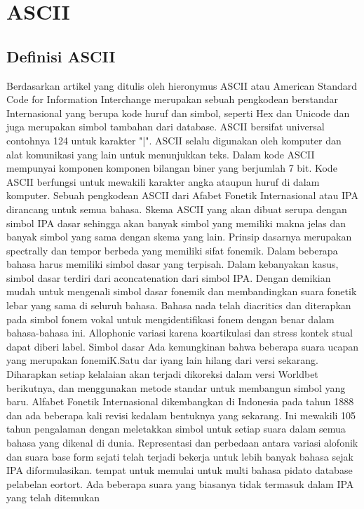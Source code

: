 \section{ASCII}
\subsection{Definisi ASCII}
		Berdasarkan artikel yang ditulis oleh hieronymus \cite{hieronymus1993ascii}
	ASCII atau American Standard Code for Information Interchange merupakan sebuah pengkodean berstandar Internasional yang berupa kode huruf dan simbol, seperti Hex dan Unicode dan juga merupakan simbol tambahan dari database. ASCII bersifat universal contohnya 124 untuk karakter "|". ASCII selalu digunakan oleh komputer dan alat komunikasi yang lain untuk menunjukkan teks.
    Dalam kode ASCII mempunyai komponen komponen bilangan biner yang berjumlah 7 bit. Kode ASCII berfungsi untuk mewakili karakter angka ataupun huruf di dalam komputer. Sebuah pengkodean ASCII dari Afabet Fonetik Internasional atau IPA dirancang untuk semua bahasa. Skema ASCII yang akan dibuat serupa dengan simbol IPA dasar sehingga akan banyak simbol yang memiliki makna jelas dan banyak simbol yang sama dengan skema yang lain. Prinsip dasarnya merupakan spectrally dan tempor berbeda yang memiliki sifat fonemik.
    Dalam beberapa bahasa harus memiliki simbol dasar yang terpisah. Dalam kebanyakan kasus, simbol dasar terdiri dari aconcatenation dari simbol IPA. Dengan demikian mudah untuk mengenali simbol dasar fonemik dan membandingkan suara fonetik lebar yang sama di seluruh bahasa. Bahasa nada telah diacritics dan diterapkan pada simbol fonem vokal untuk mengidentifikasi fonem dengan benar dalam bahasa-bahasa ini. Allophonic variasi karena koartikulasi dan stress kontek stual dapat diberi label.
	Simbol dasar Ada kemungkinan bahwa beberapa suara ucapan yang merupakan fonemiK.Satu dar iyang lain hilang dari versi sekarang. Diharapkan setiap kelalaian akan terjadi dikoreksi dalam versi Worldbet berikutnya, dan menggunakan metode standar untuk membangun simbol yang baru. Alfabet Fonetik Internasional dikembangkan di Indonesia pada tahun 1888 dan ada beberapa kali revisi kedalam bentuknya yang sekarang. Ini mewakili 105 tahun pengalaman dengan meletakkan simbol untuk setiap suara dalam semua bahasa yang dikenal di dunia.
	Representasi dan perbedaan antara variasi alofonik dan suara base form sejati telah terjadi
	bekerja untuk lebih banyak bahasa sejak IPA diformulasikan.
	tempat untuk memulai untuk multi bahasa pidato database pelabelan eortort.
	Ada beberapa suara yang biasanya tidak termasuk dalam IPA yang telah ditemukan
